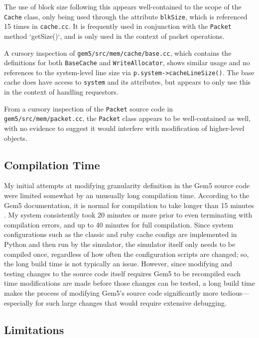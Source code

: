 \documentclass[12pt,twoside]{reedthesis}
\begin{document}
	The use of block size following this appears well-contained to the scope of the \verb`Cache` class, only being used through the attribute \verb`blkSize`, which is referenced 15 times in \verb`cache.cc`. It is frequently used in conjunction with the \verb`Packet` method `getSize()`, and is only used in the context of packet operations.
	
	A cursory inspection of \verb`gem5/src/mem/cache/base.cc`, which contains the definitions for both \verb`BaseCache` and \verb`WriteAllocator`, shows similar usage and no references to the system-level line size via \verb`p.system->cacheLineSize()`. The base cache does have access to \verb`system` and its attributes, but appears to only use this in the context of handling requestors.
	
	From a cursory inspection of the \verb`Packet` source code in \verb`gem5/src/mem/packet.cc`, the \verb`Packet` class appears to be well-contained as well, with no evidence to suggest it would interfere with modification of higher-level objects.

	\subsection*{Compilation Time}

	My initial attempts at modifying granularity definition in the Gem5 source code were limited somewhat by an unusually long compilation time. According to the Gem5 documentation, it is normal for compilation to take longer than 15 minutes \cite{gem5-build}. My system consistently took 20 minutes or more prior to even terminating with compilation errors, and up to 40 minutes for full compilation. Since system configurations such as the classic and ruby cache configs are implemented in Python and then run by the simulator, the simulator itself only needs to be compiled once, regardless of how often the configuration scripts are changed; so, the long build time is not typically an issue. However, since modifying and testing changes to the source code itself requires Gem5 to be recompiled each time modifications are made before those changes can be tested, a long build time makes the process of modifying Gem5's source code significantly more tedious---especially for such large changes that would require extensive debugging.

	\subsection*{Limitations}
\end{document}
